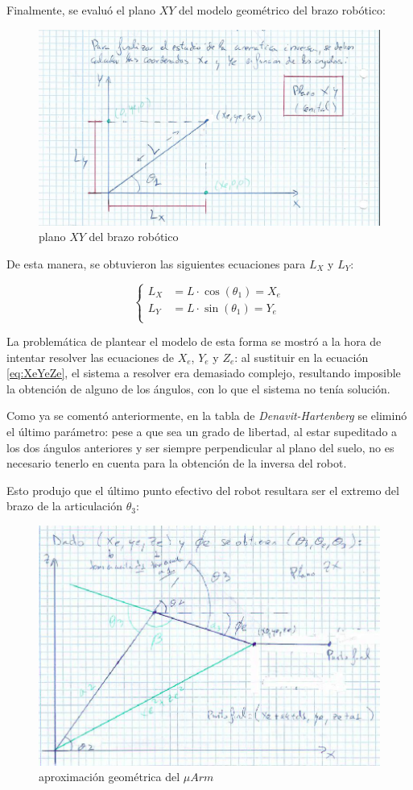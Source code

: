 \documentclass[a4paper,12pt]{article}
\begin{document}
Finalmente, se evaluó el plano $XY$ del modelo geométrico del brazo robótico:

\begin{figure}[H]
    \centering
    \includegraphics[width=.8\linewidth]{images/ik_xy_first_approach.png}
    \caption{plano $XY$ del brazo robótico}
    \label{fig:xy_first_approrach}
\end{figure}

De esta manera, se obtuvieron las siguientes ecuaciones para $L_X$ y $L_Y$:

\begin{equation} \label{eq:lx_ly_equations}
    \left\{
    \begin{aligned}
        L_X & = L \cdot \cos(\theta_1) = X_e \\
        L_Y & = L \cdot \sin(\theta_1) = Y_e \\
    \end{aligned}
    \right.
\end{equation}

La problemática de plantear el modelo de esta forma se mostró a la hora de intentar
resolver las ecuaciones de $X_e$, $Y_e$ y $Z_e$: al sustituir en la ecuación \ref{eq:XeYeZe},
el sistema a resolver era demasiado complejo, resultando imposible la obtención
de alguno de los ángulos, con lo que el sistema no tenía solución.

Como ya se comentó anteriormente, en la tabla de \textit{Denavit-Hartenberg} se eliminó
el último parámetro: pese a que sea un grado de libertad, al estar supeditado a los dos
ángulos anteriores y ser siempre perpendicular al plano del suelo, no es necesario
tenerlo en cuenta para la obtención de la inversa del robot.

Esto produjo que el último punto efectivo del robot resultara ser el extremo del brazo
de la articulación $\theta_3$:

\begin{figure}[H]
    \centering
    \includegraphics[width=.5\linewidth]{images/ik_schematic.png}
    \caption{aproximación geométrica del $\mu Arm$}
    \label{fig:ik_uarm}
\end{figure}
\end{document}
